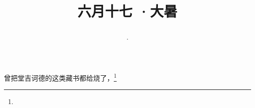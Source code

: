 \title{\date[d=22,m=7,y=2024][year:cn-y,年,month:cn,day:cn,日,·,weekday]·六月十七 ·大暑}
曾把堂吉诃德的这类藏书都给烧了，\footnote{ }

